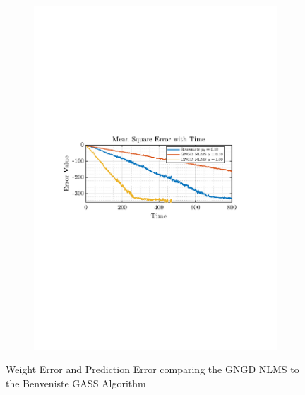 \documentclass[12pt]{article}
\begin{document}
\begin{figure}[H]
\begin{subfigure}{0.49\textwidth}
					\includegraphics[trim={2.2cm 11.2cm 3.15cm  11.2cm}, clip, width=\textwidth]{../MATLAB/figures/q2_2c_fig04.pdf} 
					\captionsetup{justification=centering}
				\end{subfigure}
				\captionsetup{justification=centering}
				\caption{Weight Error and Prediction Error comparing the GNGD NLMS to the Benveniste GASS Algorithm}
				\label{fig: 2-2c}
			\end{figure}
\end{document}
